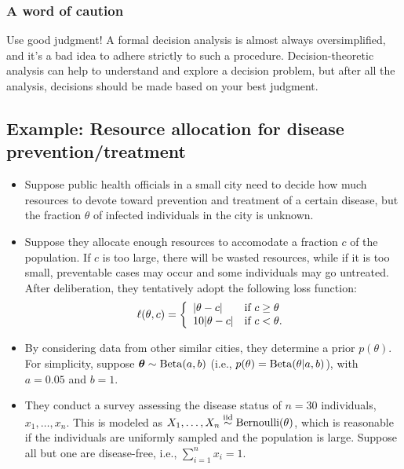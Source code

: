 \documentclass[12pt]{article}
\begin{document}
\subsubsection*{A word of caution}

Use good judgment! A formal decision analysis is almost always oversimplified, and it's a bad idea to adhere strictly to such a procedure. Decision-theoretic analysis can help to understand and explore a decision problem, but after all the analysis, decisions should be made based on your best judgment.




\subsection{Example: Resource allocation for disease prevention/treatment}
\label{section:demo}

\begin{itemize}
\item Suppose public health officials in a small city need to decide how much resources to devote toward prevention and treatment of a certain disease, but the fraction $\theta$ of infected individuals in the city is unknown.
\item Suppose they allocate enough resources to accomodate a fraction $c$ of the population. If $c$ is too large, there will be wasted resources, while if it is too small, preventable cases may occur and some individuals may go untreated. After deliberation, they tentatively adopt the following loss function:
$$\ell(\theta,c) =\left\{ \begin{array}{ll} |\theta-c| & \mbox{if } c\geq\theta \\ 10|\theta-c| & \mbox{if } c<\theta. \end{array} \right.$$
\item By considering data from other similar cities, they determine a prior $p(\theta)$. For simplicity, suppose ${\bm\theta}\sim\operatorname*{Beta}(a,b)$ (i.e., $p(\theta) =\operatorname*{Beta}(\theta|a,b)$), with $a=0.05$ and $b=1$.
\item They conduct a survey assessing the disease status of $n=30$ individuals, $x_1,\dotsc,x_n$. This is modeled as $X_1,\dotsc,X_n\stackrel{\mathrm{iid}}{\sim}\operatorname*{Bernoulli}(\theta)$, which is reasonable if the individuals are
    uniformly sampled and the population is large. Suppose all but one are disease-free, i.e.,
    $\sum_{i=1}^n x_i = 1$.
\end{itemize}
\end{document}
